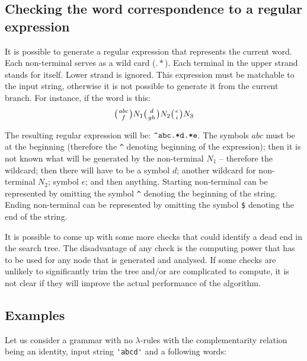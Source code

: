 \subsection{Checking the word correspondence to a regular expression}
It is possible to generate a regular expression that represents the current word. Each non-terminal serves as a wild card ($.*$). Each terminal in the upper strand stands for itself. Lower strand is ignored. This expression must be matchable to the input string, otherwise it is not possible to generate it from the current branch. For instance, if the word is this:
$$\wkpair{abc}{f}N_1\wkpair{d}{gh}N_2\wkpair{e}{i}N_3$$

The resulting regular expression will be: $\verb/^abc.*d.*e/$. The symbols $abc$ must be at the beginning (therefore the \verb/^/ denoting beginning of the expression); then it is not known what will be generated by the non-terminal $N_1$ -- therefore the wildcard; then there will have to be a symbol $d$; another wildcard for non-terminal $N_2$; symbol $e$; and then anything. Starting non-terminal can be represented by omitting the symbol \verb/^/ denoting the beginning of the string. Ending non-terminal can be represented by omitting the symbol \verb/$/ denoting the end of the string.

It is possible to come up with some more checks that could identify a dead end in the search tree. The disadvantage of any check is the computing power that has to be used for any node that is generated and analysed. If some checks are unlikely to significantly trim the tree and/or are complicated to compute, it is not clear if they will improve the actual performance of the algorithm.

\subsection{Examples}
Let us consider a grammar with no $\lambda$-rules with the complementarity relation being an identity, input string \verb/'abcd'/  and a following words:

